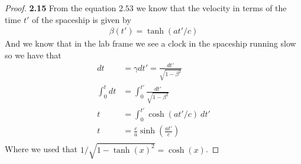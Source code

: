 \documentclass[11pt]{article}
\theoremstyle{definition}
\begin{document}
\cleardoublepage
	\begin{proof}{\textbf{2.15}}
        From the equation $2.53$ we know that the velocity in terms of the time $t'$ of
        the spaceship is given by
        \begin{align*}
            \beta(t') = \tanh(at'/c)
        \end{align*}
        And we know that in the lab frame we see a clock in the spaceship running slow
        so we have that
        \begin{align*}
            dt &= \gamma dt' = \frac{dt'}{\sqrt{1-\beta^2}}\\
            \int_0^t dt &= \int_0^{t'} \frac{dt'}{\sqrt{1-\beta^2}} \\
            t &= \int_0^{t'} \cosh(at'/c)~dt'\\
            t &= \frac{c}{a}\sinh\left(\frac{at'}{c}\right)\\
        \end{align*}
        Where we used that $1/\sqrt{1-\tanh(x)^2} = \cosh(x)$.
    \end{proof}
\end{document}
